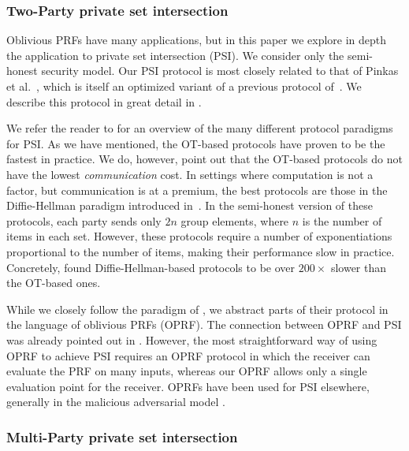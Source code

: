 \subsubsection{Two-Party private set intersection}
Oblivious PRFs have many applications, but in this paper we explore in depth the application to private set intersection (PSI).
We consider only the semi-honest security model.  Our PSI protocol is
most closely related to that of Pinkas et
al.~\cite{DBLP:conf/uss/Pinkas0SZ15}, which is itself an optimized
variant of a previous protocol of~\cite{DBLP:conf/uss/Pinkas0Z14}. We describe this protocol in great detail in .

We refer the reader to \cite{DBLP:conf/uss/Pinkas0Z14} for an overview of the many different protocol paradigms for PSI. As we have mentioned, the OT-based protocols have proven to be the fastest in practice. We do, however, point out that the OT-based protocols do not have the lowest {\em communication} cost. In settings where computation is not a factor, but communication is at a premium, the best protocols are those in the Diffie-Hellman paradigm introduced in~\cite{DBLP:conf/sigecom/HubermanFH99}. In the semi-honest version of these protocols, each party sends only $2n$ group elements, where $n$ is the number of items in each set. However, these protocols require a number of exponentiations proportional to the number of items, making their performance slow in practice. Concretely, \cite{DBLP:conf/uss/Pinkas0SZ15} found Diffie-Hellman-based protocols to be over $200\times$ slower than the OT-based ones.

While we closely follow the paradigm of \cite{DBLP:conf/uss/Pinkas0Z14}, we abstract parts of their protocol in the language of oblivious PRFs (OPRF). The connection between OPRF and PSI was already pointed out in \cite{TCC:FIPR05}. However, the most straightforward way of using OPRF to achieve PSI requires an OPRF protocol in which the receiver can evaluate the PRF on many inputs, whereas our OPRF allows only a single evaluation point for the receiver. OPRFs have been used for PSI elsewhere, generally in the malicious adversarial model \cite{TCC:JarLiu09,JC:HazLin10,TCC:Hazay15}.




\subsubsection{Multi-Party private set intersection}